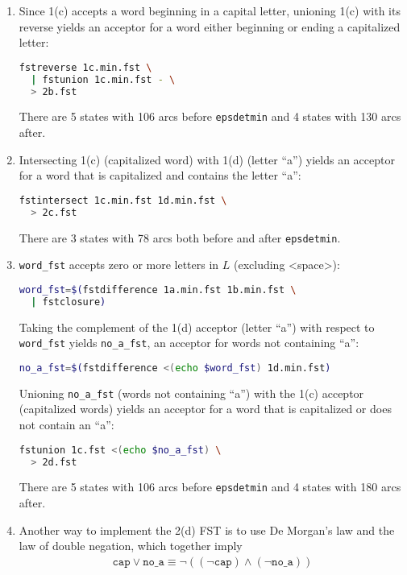 \documentclass[a4paper,oneside,reqno]{amsart}
\begin{document}
\begin{enumerate}[label=\arabic*.]
\begin{enumerate}[label=(\alph*)]
      \item Since 1(c) accepts a word beginning in a capital letter, unioning
        1(c) with its reverse yields an acceptor for a word either beginning or
        ending a capitalized letter:
        \begin{lstlisting}[language=bash]
fstreverse 1c.min.fst \
  | fstunion 1c.min.fst - \
  > 2b.fst
        \end{lstlisting}
        There are 5 states with 106 arcs before \texttt{epsdetmin} and 4
        states with 130 arcs after.

      \item Intersecting 1(c) (capitalized word) with 1(d) (letter ``a'') yields
        an acceptor for a word that is capitalized and contains the letter ``a'':
        \begin{lstlisting}[language=bash]
fstintersect 1c.min.fst 1d.min.fst \
  > 2c.fst
        \end{lstlisting}
        There are 3 states with 78 arcs both before and after \texttt{epsdetmin}.

      \item \texttt{word\_fst} accepts zero or more letters in $L$ (excluding
        <space>):
        \begin{lstlisting}[language=bash]
word_fst=$(fstdifference 1a.min.fst 1b.min.fst \
  | fstclosure)
        \end{lstlisting}

        Taking the complement of the 1(d) acceptor (letter ``a'') with respect to
        \texttt{word\_fst} yields \texttt{no\_a\_fst}, an acceptor for words
        not containing ``a'':
        \begin{lstlisting}[language=bash]
no_a_fst=$(fstdifference <(echo $word_fst) 1d.min.fst)
        \end{lstlisting}

        Unioning \texttt{no\_a\_fst} (words not containing ``a'') with
        the 1(c) acceptor (capitalized words) yields an acceptor for
        a word that is capitalized or does not contain an ``a'':
        \begin{lstlisting}[language=bash]
fstunion 1c.fst <(echo $no_a_fst) \
  > 2d.fst
        \end{lstlisting}
        There are 5 states with 106 arcs before \texttt{epsdetmin} and 4
        states with 180 arcs after.

      \item Another way to implement the 2(d) FST is to use De Morgan's law and
        the law of double negation, which together imply
        \begin{align}
          \texttt{cap} \lor \texttt{no\_a} \equiv
          \lnot ((\lnot \texttt{cap}) \land (\lnot \texttt{no\_a}))
        \end{align}


\end{enumerate}
\end{enumerate}
\end{document}
